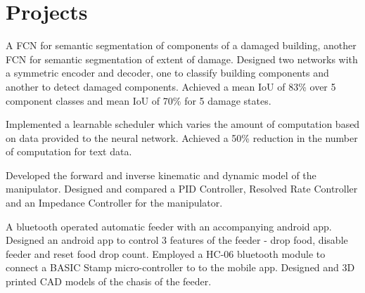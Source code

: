 \section{Projects}
  \resumeSubHeadingListStart

        \resumeItemListStart
            {A FCN for semantic segmentation of components of a damaged building, another FCN for semantic segmentation of extent of damage.}
            {Designed two networks with a symmetric encoder and decoder, one to classify building components and another to detect damaged components.}
            {Achieved a mean IoU of 83\% over 5 component classes and mean IoU of 70\% for 5 damage states.}
        \resumeItemListEnd
      
            \resumeItemListStart
          {Implemented a learnable scheduler which varies the amount of computation based on data provided to the neural network.}
          {Achieved a 50\% reduction in the number of computation for text data.}
      \resumeItemListEnd
      
      \resumeItemListStart
          {Developed the forward and inverse kinematic and dynamic model of the manipulator.}
          {Designed and compared a PID Controller, Resolved Rate Controller and an Impedance Controller for the manipulator.}
          \resumeItemListEnd
          
      \resumeItemListStart
        {A bluetooth operated automatic feeder with an accompanying android app.}
        {Designed an android app to control 3 features of the feeder - drop food, disable feeder and reset food drop count. }
        {Employed a HC-06 bluetooth module to connect a BASIC Stamp micro-controller to to the mobile app.}
        {Designed and 3D printed CAD models of the chasis of the feeder.}
          \resumeItemListEnd
      

